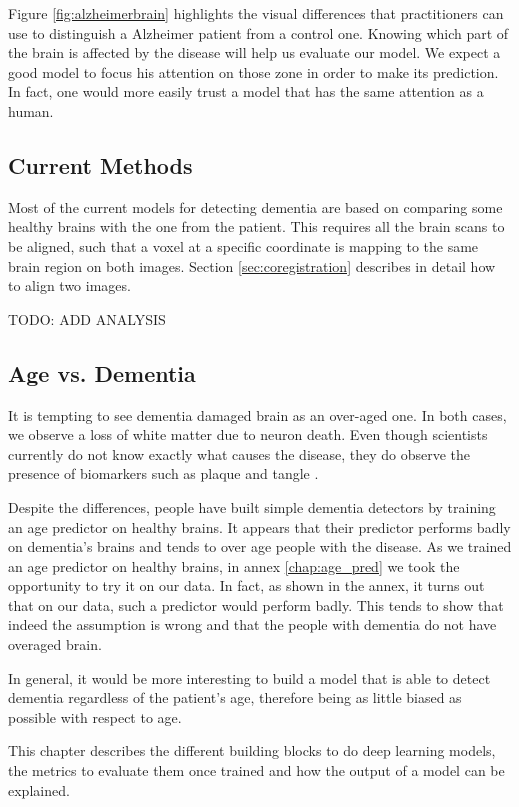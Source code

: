 Figure \ref{fig:alzheimerbrain} highlights the visual differences that practitioners can use to distinguish a Alzheimer patient from a control one. Knowing which part of the brain is affected by the disease will help us evaluate our model. We expect a good model to focus his attention on those zone in order to make its prediction. In fact, one would more easily trust a model that has the same attention as a human.

\subsection{Current Methods}
Most of the current models for detecting dementia are based on comparing some healthy brains with the one from the patient. This requires all the brain scans to be aligned, such that a voxel at a specific coordinate is mapping to the same brain region on both images. Section \ref{sec:coregistration} describes in detail how to align two images.

TODO: ADD ANALYSIS


\subsection{Age vs. Dementia}

It is tempting to see dementia damaged brain as an over-aged one. In both cases, we observe a loss of white matter due to neuron death. Even though scientists currently do not know exactly what causes the disease, they do observe the presence of biomarkers such as plaque and tangle \cite{alzheimer_past_present_future}.

Despite the differences, people have built simple dementia detectors by training an age predictor on healthy brains. It appears that their predictor performs badly on dementia's brains and tends to over age people with the disease. As we trained an age predictor on healthy brains, in annex \ref{chap:age_pred} we took the opportunity to try it on our data. In fact, as shown in the annex, it turns out that on our data, such a predictor would perform badly. This tends to show that indeed the assumption is wrong and that the people with dementia do not have overaged brain.

In general, it would be more interesting to build a model that is able to detect dementia regardless of the patient's age, therefore being as little biased as possible with respect to age.



This chapter describes the different building blocks to do deep learning models, the metrics to evaluate them once trained and how the output of a model can be explained.

